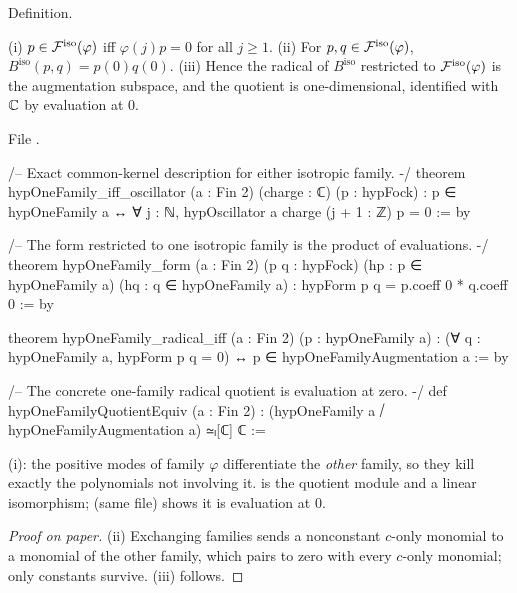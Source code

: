 \begin{status}
Definition.
\end{status}

\begin{theorem}\label{ch17:thm:onefamily}
(i) $p\in\mathcal{F}^{\mathrm{iso}}(\varphi)$ iff $\varphi(j)p=0$ for all $j\ge1$.  (ii) For $p,q\in\mathcal{F}^{\mathrm{iso}}(\varphi)$,
$B^{\mathrm{iso}}(p,q)=p(0)q(0)$.  (iii) Hence the radical of $B^{\mathrm{iso}}$ restricted to $\mathcal{F}^{\mathrm{iso}}(\varphi)$ is the augmentation
subspace, and the quotient is one-dimensional, identified with ${\mathbb{C}}$ by evaluation at $0$.
\end{theorem}

\noindent File .
\begin{leancode}
/-- Exact common-kernel description for either isotropic family. -/
theorem hypOneFamily_iff_oscillator (a : Fin 2) (charge : ℂ) (p : hypFock) :
    p ∈ hypOneFamily a ↔ ∀ j : ℕ, hypOscillator a charge (j + 1 : ℤ) p = 0 := by

/-- The form restricted to one isotropic family is the product of evaluations. -/
theorem hypOneFamily_form (a : Fin 2) (p q : hypFock)
    (hp : p ∈ hypOneFamily a) (hq : q ∈ hypOneFamily a) :
    hypForm p q = p.coeff 0 * q.coeff 0 := by

theorem hypOneFamily_radical_iff (a : Fin 2) (p : hypOneFamily a) :
    (∀ q : hypOneFamily a, hypForm p q = 0) ↔ p ∈ hypOneFamilyAugmentation a := by

/-- The concrete one-family radical quotient is evaluation at zero. -/
def hypOneFamilyQuotientEquiv (a : Fin 2) :
    (hypOneFamily a ⧸ hypOneFamilyAugmentation a) ≃ₗ[ℂ] ℂ :=
\end{leancode}

\begin{dictionary}
(i): the positive modes of family $\varphi$ differentiate the \emph{other} family, so they kill exactly the polynomials
not involving it.   is the quotient module and  a linear isomorphism;
 (same file) shows it is evaluation at $0$.
\end{dictionary}

\begin{proof}[Proof on paper]
(ii) Exchanging families sends a nonconstant $c$-only monomial to a monomial of the other family, which pairs to
zero with every $c$-only monomial; only constants survive.  (iii) follows.
\end{proof}

